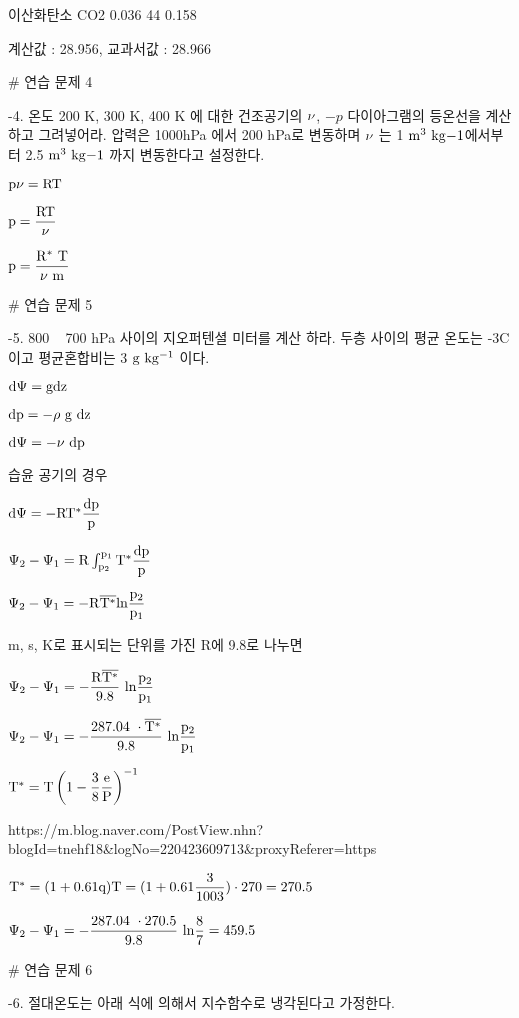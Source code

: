 이산화탄소	CO2	0.036	44 0.158

계산값 : 28.956, 교과서값 : 28.966


# 연습 문제 4


-4. 온도 200 K, 300 K, 400 K 에 대한 건조공기의 $ \rm \nu $, $ - p$ 다이아그램의 등온선을 계산하고 그려넣어라. 압력은 1000hPa 에서 200 hPa로 변동하며  $ \rm \nu $ 는 1 $\rm m^{3}~ kg{-1}$에서부터 2.5 $\rm m^{3}~ kg{-1}$ 까지 변동한다고 설정한다.

$ \rm p  \nu = R T $

$ \rm p = \dfrac{R T}{ \nu} $

$ \rm p = \dfrac{R^{*} ~T}{ \nu~ m} $



# 연습 문제 5


-5. 800 ~ 700 hPa 사이의 지오퍼텐셜 미터를 계산 하라. 두층 사이의 평균 온도는 -3C 이고 평균혼합비는 3 $ \rm g~kg^{-1}$ 이다.


$ \rm d \Psi  = g dz $

$ \rm dp = - \rho~g~dz $

$ \rm d \Psi  = - \nu~ dp $

습윤 공기의 경우

$ \rm d \Psi  = - R T^{*} \dfrac{dp}{p} $

$ \rm \Psi_2 - \Psi_1  =  R \int_{p_2}^{p_1} T^{*} \dfrac{dp}{p} $

$ \rm \Psi_2 - \Psi_1  =  -R \overline{ T^{*}} ln \dfrac{p_2}{p_1} $

m, s, K로 표시되는 단위를 가진 R에 9.8로 나누면

$ \rm \Psi_2 - \Psi_1  =  - \dfrac {R \overline{ T^{*}}}{9.8} ~ ln \dfrac{p_2}{p_1} $

$ \rm \Psi_2 - \Psi_1  =  - \dfrac {287.04 ~\cdot\overline{ T^{*}}}{9.8} ~ ln \dfrac{p_2}{p_1} $


$\rm T^{*} = T \left( 1- \dfrac{3}{8} \dfrac{e}{P} \right)^{-1}$


https://m.blog.naver.com/PostView.nhn?blogId=tnehf18&logNo=220423609713&proxyReferer=https%

$\rm T^{*} = (1 + 0.61 q) T = (1 + 0.61 \dfrac{3}{1003}) \cdot 270 = 270.5$

$ \rm \Psi_2 - \Psi_1  =  - \dfrac {287.04 ~\cdot{ 270.5}}{9.8} ~ ln \dfrac{8}{7}  = 459.5$




# 연습 문제 6


-6. 절대온도는 아래 식에 의해서 지수함수로 냉각된다고 가정한다.

